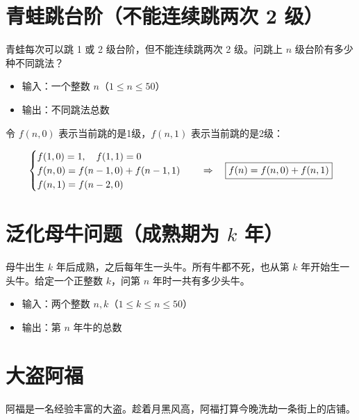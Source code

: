 \documentclass[11pt]{exam-zh}
\begin{document}
\begin{center}
	
	
\end{center}




\section{青蛙跳台阶（不能连续跳两次 2 级）}
青蛙每次可以跳 1 或 2 级台阶，但不能连续跳两次 2 级。问跳上 $n$ 级台阶有多少种不同跳法？

\begin{itemize}[leftmargin=2em]
	\item 输入：一个整数 $n$（$1 \leq n \leq 50$）
	\item 输出：不同跳法总数
\end{itemize}

令 $f(n,0)$ 表示当前跳的是1级，$f(n,1)$ 表示当前跳的是2级：
\begin{center}
	\[
	\begin{cases}
		f(1,0) = 1,\quad f(1,1) = 0 \\
		f(n,0) = f(n-1,0) + f(n-1,1) \\
		f(n,1) = f(n-2,0)
	\end{cases}
	\quad \Rightarrow \quad \fbox{$f(n) = f(n,0) + f(n,1)$}
	\]
\end{center}


\section{泛化母牛问题（成熟期为 $k$ 年）}
母牛出生 $k$ 年后成熟，之后每年生一头牛。所有牛都不死，也从第 $k$ 年开始生一头牛。给定一个正整数 $k$，问第 $n$ 年时一共有多少头牛。

\begin{itemize}[leftmargin=2em]
	\item 输入：两个整数 $n, k$（$1 \leq k \leq n \leq 50$）
	\item 输出：第 $n$ 年牛的总数
\end{itemize}

\begin{center}
	
	
\end{center}

\section{大盗阿福}
阿福是一名经验丰富的大盗。趁着月黑风高，阿福打算今晚洗劫一条街上的店铺。
\end{document}
